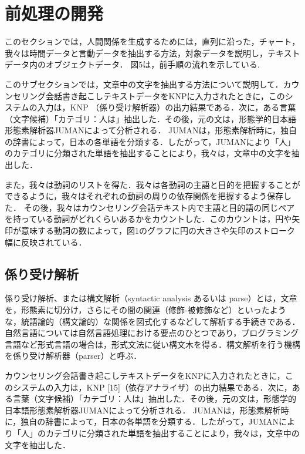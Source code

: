 \documentclass[shuuron]{kuee}
\begin{document}
\section{前処理の開発}

このセクションでは，人間関係を生成するためには，直列に沿った，チャート，我々は時間データと言動データを抽出する方法，対象データを説明し，テキストデータ内のオブジェクトデータ． 図5は，前手順の流れを示している.

このサブセクションでは，文章中の文字を抽出する方法について説明して．カウンセリング会話書き起こしテキストデータをKNPに入力されたときに，このシステムの入力は，KNP \cite{KNP}（係り受け解析器）の出力結果である．次に，ある言葉（文字候補）「カテゴリ：人は」抽出した．その後，元の文は，形態学的日本語形態素解析器JUMAN\cite{juman}によって分析される． JUMANは，形態素解析時に，独自の辞書によって，日本の各単語を分類する．したがって，JUMANにより「人」のカテゴリに分類された単語を抽出することにより，我々は，文章中の文字を抽出した．

また，我々は動詞のリストを得た．我々は各動詞の主語と目的を把握することができるように，我々はそれぞれの動詞の周りの依存関係を把握するよう保存した．
その後，我々はカウンセリング会話テキスト内で主語と目的語の同じペアを持っている動詞がどれくらいあるかをカウントした．このカウントは，円や矢印が意味する動詞の数によって，図1のグラフに円の大きさや矢印のストローク幅に反映されている．


\subsection{係り受け解析}


係り受け解析、または構文解析（syntactic analysis あるいは parse）とは，文章を，形態素に切分け，さらにその間の関連（修飾-被修飾など）といったような，統語論的（構文論的）な関係を図式化するなどして解析する手続きである．自然言語については自然言語処理における要点のひとつであり，プログラミング言語など形式言語の場合は，形式文法に従い構文木を得る．構文解析を行う機構を係り受け解析器（parser）と呼ぶ．

カウンセリング会話書き起こしテキストデータをKNPに入力されたときに，このシステムの入力は，KNP [15]（依存アナライザ）の出力結果である．次に，ある言葉（文字候補）「カテゴリ：人は」抽出した．その後，元の文は，形態学的日本語形態素解析器JUMAN\cite{juman}によって分析される． JUMANは，形態素解析時に，独自の辞書によって，日本の各単語を分類する．したがって，JUMANにより「人」のカテゴリに分類された単語を抽出することにより，我々は，文章中の文字を抽出した．
\end{document}

